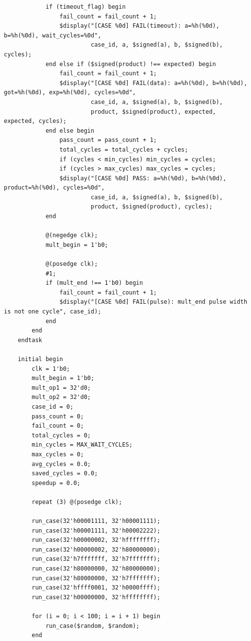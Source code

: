 \documentclass{article}
\begin{document}
\begin{verbatim}
            if (timeout_flag) begin
                fail_count = fail_count + 1;
                $display("[CASE %0d] FAIL(timeout): a=%h(%0d), b=%h(%0d), wait_cycles=%0d",
                         case_id, a, $signed(a), b, $signed(b), cycles);
            end else if ($signed(product) !== expected) begin
                fail_count = fail_count + 1;
                $display("[CASE %0d] FAIL(data): a=%h(%0d), b=%h(%0d), got=%h(%0d), exp=%h(%0d), cycles=%0d",
                         case_id, a, $signed(a), b, $signed(b),
                         product, $signed(product), expected, expected, cycles);
            end else begin
                pass_count = pass_count + 1;
                total_cycles = total_cycles + cycles;
                if (cycles < min_cycles) min_cycles = cycles;
                if (cycles > max_cycles) max_cycles = cycles;
                $display("[CASE %0d] PASS: a=%h(%0d), b=%h(%0d), product=%h(%0d), cycles=%0d",
                         case_id, a, $signed(a), b, $signed(b),
                         product, $signed(product), cycles);
            end

            @(negedge clk);
            mult_begin = 1'b0;

            @(posedge clk);
            #1;
            if (mult_end !== 1'b0) begin
                fail_count = fail_count + 1;
                $display("[CASE %0d] FAIL(pulse): mult_end pulse width is not one cycle", case_id);
            end
        end
    endtask

    initial begin
        clk = 1'b0;
        mult_begin = 1'b0;
        mult_op1 = 32'd0;
        mult_op2 = 32'd0;
        case_id = 0;
        pass_count = 0;
        fail_count = 0;
        total_cycles = 0;
        min_cycles = MAX_WAIT_CYCLES;
        max_cycles = 0;
        avg_cycles = 0.0;
        saved_cycles = 0.0;
        speedup = 0.0;

        repeat (3) @(posedge clk);

        run_case(32'h00001111, 32'h00001111);
        run_case(32'h00001111, 32'h00002222);
        run_case(32'h00000002, 32'hffffffff);
        run_case(32'h00000002, 32'h80000000);
        run_case(32'h7fffffff, 32'h7fffffff);
        run_case(32'h80000000, 32'h80000000);
        run_case(32'h80000000, 32'h7fffffff);
        run_case(32'hffff0001, 32'h0000ffff);
        run_case(32'h00000000, 32'hffffffff);

        for (i = 0; i < 100; i = i + 1) begin
            run_case($random, $random);
        end


\end{verbatim}
\end{document}
